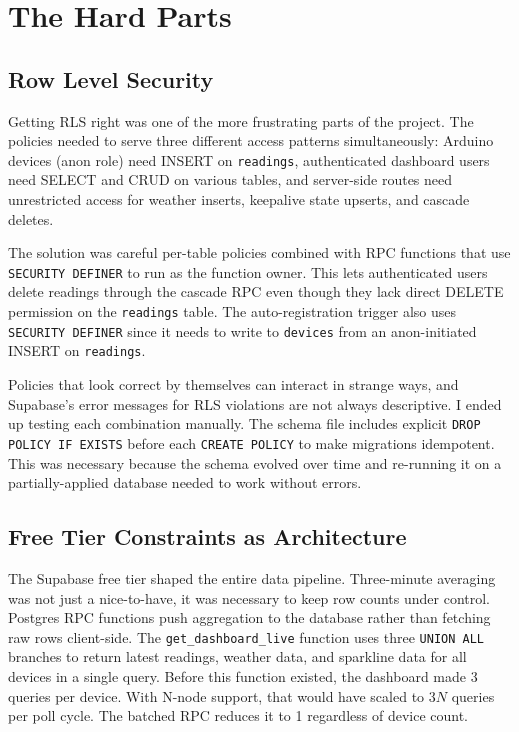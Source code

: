 \documentclass[11pt, letterpaper]{article}
\begin{document}
\section{The Hard Parts}

\subsection{Row Level Security}

Getting RLS right was one of the more frustrating parts of the project. The policies needed to serve three different access patterns simultaneously: Arduino devices (anon role) need INSERT on \texttt{readings}, authenticated dashboard users need SELECT and CRUD on various tables, and server-side routes need unrestricted access for weather inserts, keepalive state upserts, and cascade deletes.

The solution was careful per-table policies combined with RPC functions that use \texttt{SECURITY DEFINER} to run as the function owner. This lets authenticated users delete readings through the cascade RPC even though they lack direct DELETE permission on the \texttt{readings} table. The auto-registration trigger also uses \texttt{SECURITY DEFINER} since it needs to write to \texttt{devices} from an anon-initiated INSERT on \texttt{readings}.

Policies that look correct by themselves can interact in strange ways, and Supabase's error messages for RLS violations are not always descriptive. I ended up testing each combination manually. The schema file includes explicit \texttt{DROP POLICY IF EXISTS} before each \texttt{CREATE POLICY} to make migrations idempotent. This was necessary because the schema evolved over time and re-running it on a partially-applied database needed to work without errors.

\subsection{Free Tier Constraints as Architecture}

The Supabase free tier shaped the entire data pipeline. Three-minute averaging was not just a nice-to-have, it was necessary to keep row counts under control. Postgres RPC functions push aggregation to the database rather than fetching raw rows client-side. The \texttt{get\_dashboard\_live} function uses three \texttt{UNION ALL} branches to return latest readings, weather data, and sparkline data for all devices in a single query. Before this function existed, the dashboard made 3 queries per device. With N-node support, that would have scaled to $3N$ queries per poll cycle. The batched RPC reduces it to 1 regardless of device count.
\end{document}
